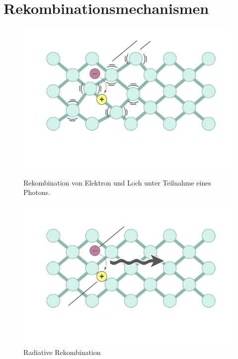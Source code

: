 
\thispagestyle{fancy}


\section{Rekombinationsmechanismen}

\begin{figure}[htb]
    \centering
    \begin{minipage}[t]{0.49\linewidth}
        \centering
        \includegraphics[width=\linewidth]{Bilder/nonradRekomb.png}
        \caption{Rekombination von Elektron und Loch unter Teilnahme eines Photons.}
    \end{minipage}%
    \hfill
    \begin{minipage}[t]{0.49\linewidth}
        \centering
        \includegraphics[width=\linewidth]{Bilder/radRekomb.png}
        \caption{Radiative Rekombination }
    \end{minipage}
\end{figure}
